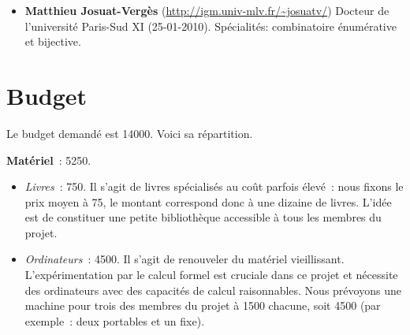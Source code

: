 \documentclass[10pt,reqno]{amsart}
\numberwithin{equation}{subsection}
\begin{document}
\begin{itemize}[fullwidth]
\item {\bf Matthieu Josuat-Vergès} (\url{http://igm.univ-mlv.fr/~josuatv/})
Docteur de l'université Paris-Sud XI (25-01-2010). 
Spécialités: combinatoire énumérative et bijective. 
% 


\end{itemize}

\section{Budget}
Le budget demandé est 14000\texteuro. Voici sa répartition.
\smallskip

{\bf Matériel}~: 5250\texteuro.
\begin{itemize}[fullwidth]
    \item {\em Livres}~: 750\texteuro.
    Il s'agit de livres spécialisés au coût parfois élevé~: nous
    fixons le prix moyen à 75\texteuro, le montant correspond donc
    à une dizaine de livres. L'idée est de constituer une petite
    \og bibliothèque \fg{} accessible à tous les membres du projet.

    \item {\em Ordinateurs}~: 4500\texteuro.
    Il s'agit de renouveler du matériel vieillissant.
    L'expérimentation par le calcul formel est cruciale dans ce
    projet et nécessite des ordinateurs avec des capacités de calcul
    raisonnables. Nous prévoyons une machine pour trois des membres du 
    projet à 1500\texteuro{} chacune, soit 4500\texteuro{} (par exemple~:
    deux portables et un fixe).

\end{itemize}
\smallskip
    
\end{document}
